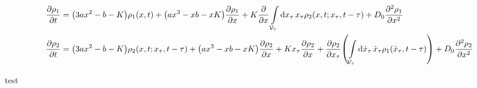 \documentclass[a4paper,10pt]{article}
\newcommand{\intl}{\int\limits}
\begin{document}
\begin{align}
	\pdv{\rho_1}{t}
	&=
	\pqty{3ax^2-b-K}
	\rho_1
	(x,t)
	+
	\pqty{ax^3-xb-xK}
	\pdv{\rho_1}{x}
	+
	K
	\pdv{x}
	\intl_{\mathcal{V}_\tau}
	\dd{x_\tau}
	x_\tau
	\rho_2
	(x,t;x_\tau,t-\tau)	
	+
	D_0
	\pdv[2]{\rho_1}{x}
\\
	\pdv{\rho_2}{t}
	&=
	\pqty{3ax^2-b-K}
	\rho_2
	(x,t;x_\tau,t-\tau)
	+
	\pqty{ax^3-xb-xK}
	\pdv{\rho_2}{x}
	+
	Kx_\tau
	\pdv{\rho_2}{x}
	+
	\pdv{\rho_2}{x_\tau}
	\pqty{
		\intl_{\mathcal{V}_\tau}
		\dd{\dot{x}_\tau}
		\dot{x}_\tau
		\rho_1
		(\dot{x}_\tau,t-\tau)
	}
	+
	D_0
	\pdv[2]{\rho_2}{x}
\end{align}

test
\end{document}
